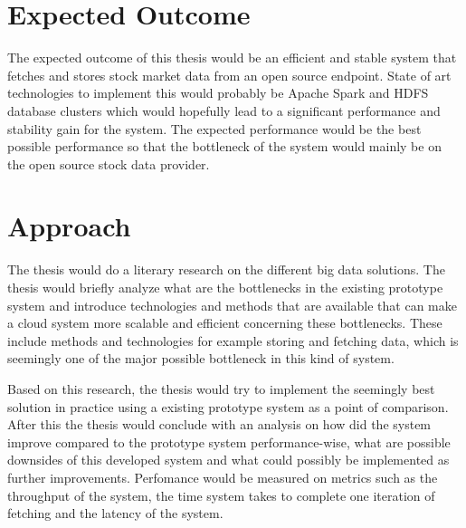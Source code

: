\documentclass[article,11pt]{article}
\begin{document}
\section{Expected Outcome}

The expected outcome of this thesis would be an efficient and stable system that fetches and stores stock market data from an open source endpoint. State of art technologies to implement this would probably be Apache Spark and HDFS database clusters \cite{mohiud} which would hopefully lead to a significant performance and stability gain for the system. The expected performance would be the best possible performance so that the bottleneck of the system would mainly be on the open source stock data provider.

\section{Approach}

The thesis would do a literary research on the different big data solutions. The thesis would briefly analyze what are the bottlenecks in the existing prototype system and introduce technologies and methods that are available that can make a cloud system more scalable and efficient concerning these bottlenecks. These include methods and technologies for example storing and fetching data, which is seemingly one of the major possible bottleneck in this kind of system. 

Based on this research, the thesis would try to implement the seemingly best solution in practice using a existing prototype system as a point of comparison. After this the thesis would conclude with an analysis on how did the system improve compared to the prototype system performance-wise, what are possible downsides of this developed system and what could possibly be implemented as further improvements. Perfomance would be measured on metrics such as the throughput of the system, the time system takes to complete one iteration of fetching and the latency of the system.


\printbibliography
\end{document}
